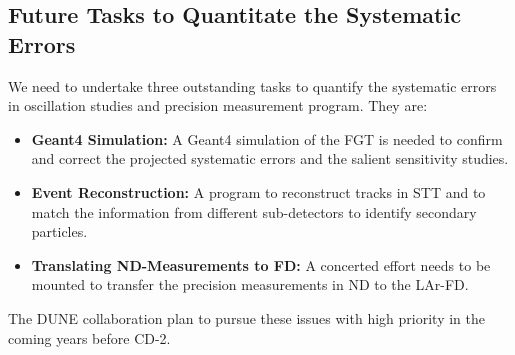 \subsection{Future Tasks to Quantitate the Systematic Errors}
\label{cdrsec:detectors-nd-ref-fgt-req-future} 

We need to undertake three outstanding tasks to quantify the systematic errors in oscillation studies 
and precision measurement program. They are: 
\begin{itemize}
    \item {\bf Geant4 Simulation:} A Geant4 simulation of the FGT is needed to confirm and correct 
    the projected systematic errors and  the salient sensitivity studies. 
     \item {\bf Event Reconstruction:} A program to reconstruct tracks in STT and to match the 
     information from different sub-detectors to identify secondary particles.  
     \item {\bf Translating ND-Measurements to FD:} A concerted effort needs to be mounted to transfer 
     the precision measurements in ND to the LAr-FD. 
\end{itemize}    
The DUNE collaboration plan to pursue these issues with high priority in the coming years before CD-2. 
